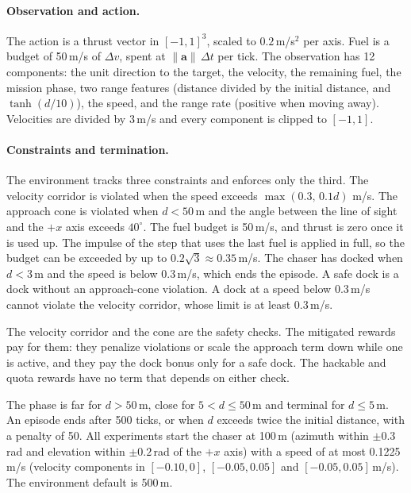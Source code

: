 \documentclass[11pt]{article}
\begin{document}
\paragraph{Observation and action.} The action is a thrust vector in
$[-1,1]^3$, scaled to $0.2$\,m/s$^2$ per axis. Fuel is a budget of 50\,m/s of
$\Delta v$, spent at $\lVert\mathbf a\rVert\,\Delta t$ per tick. The
observation has 12 components: the unit direction to the target, the velocity,
the remaining fuel, the mission phase, two range features (distance divided by
the initial distance, and $\tanh(d/10)$), the speed, and the range rate
(positive when moving away). Velocities are divided by 3\,m/s and every
component is clipped to $[-1,1]$.

\paragraph{Constraints and termination.} The environment tracks three
constraints and enforces only the third. The velocity corridor is violated when
the speed exceeds $\max(0.3,\,0.1d)$ m/s. The approach cone is violated when
$d<50$\,m and the angle between the line of sight and the $+x$ axis exceeds
$40^\circ$. The fuel budget is 50\,m/s, and thrust is zero once it is used up.
The impulse of the step that uses the last fuel is applied in full, so the
budget can be exceeded by up to $0.2\sqrt3\approx0.35$\,m/s. The chaser has
docked when $d<3$\,m and the speed is below $0.3$\,m/s, which ends the
episode. A safe dock is a dock without an approach-cone violation. A dock at a
speed below 0.3\,m/s cannot violate the velocity corridor, whose limit is at
least 0.3\,m/s.

The velocity corridor and the cone are the safety checks. The mitigated rewards
pay for them: they penalize violations or scale the approach term down while
one is active, and they pay the dock bonus only for a safe dock. The hackable
and quota rewards have no term that depends on either check.

The phase is far for $d>50$\,m, close for $5<d\le 50$\,m and terminal for
$d\le5$\,m. An episode ends after 500 ticks, or when $d$ exceeds twice the
initial distance, with a penalty of 50. All experiments start the chaser at
100\,m (azimuth within $\pm0.3$\,rad and elevation within $\pm0.2$\,rad of the
$+x$ axis) with a speed of at most 0.1225\,m/s (velocity components in
$[-0.10,0]$, $[-0.05,0.05]$ and $[-0.05,0.05]$\,m/s). The environment default
is 500\,m.
\end{document}
